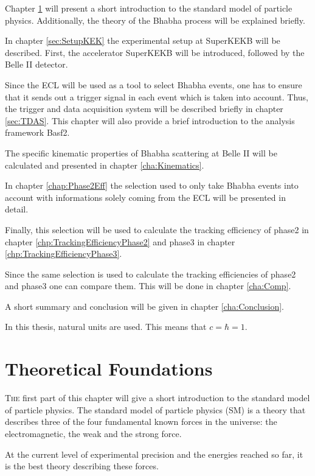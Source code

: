 \documentclass[a4paper,11pt,twosided,final,german,openbib,pdftex,listof=totoc,bibliography=totoc]{scrbook}
\begin{document}
Chapter \ref{cha:SM} will present a short introduction to the standard model of particle physics. Additionally, the theory of the Bhabha process will be explained briefly. 

In chapter \ref{sec:SetupKEK} the experimental setup at SuperKEKB will be described. First, the accelerator SuperKEKB will be introduced, followed by the Belle II detector.

Since the ECL will be used as a tool to select Bhabha events, one has to ensure that it sends out a trigger signal in each event which is taken into account. Thus, the trigger and data acquisition system will be described briefly in chapter \ref{sec:TDAS}. This chapter will also provide a brief introduction to the analysis framework Basf2.   


The specific kinematic properties of Bhabha scattering at Belle II will be calculated and presented in chapter \ref{cha:Kinematics}.

In chapter \ref{chap:Phase2Eff} the selection used to only take Bhabha events into account with informations solely coming from the ECL will be presented in detail. 

Finally, this selection will be used to calculate the tracking efficiency of phase2 in chapter \ref{chp:TrackingEfficiencyPhase2} and phase3 in chapter \ref{chp:TrackingEfficiencyPhase3}.

Since the same selection is used to calculate the tracking efficiencies of phase2 and phase3 one can compare them. This will be done in chapter \ref{cha:Comp}.

A short summary and conclusion will be given in chapter \ref{cha:Conclusion}.
\newline 

In this thesis, natural units are used. This means that $c = \hbar = 1$.
\newline


\chapter{Theoretical Foundations}
\label{cha:SM}

\lettrine{T}{he} first part of this chapter will give  a short introduction to the standard model of particle physics. The standard model of particle physics (SM) is a theory that describes three of the four fundamental known forces in the universe: the electromagnetic, the weak and the strong force. 

 At the current level of experimental precision and the energies reached so far, it is the best theory describing these forces.
 
\end{document}
